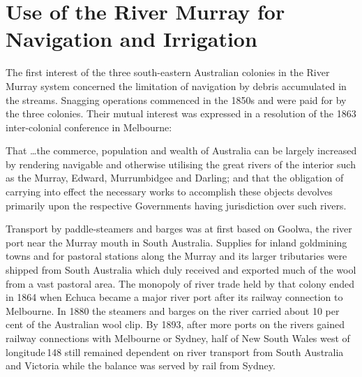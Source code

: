 
\setcounter{endnote}{0}

\chapter{Use of the River Murray for Navigation and Irrigation}
\label{ch:murray}


The first interest of the three south-eastern Australian colonies in
the River Murray system concerned the limitation of navigation by
debris accumulated in the streams.  Snagging operations commenced in
the 1850s and were paid for by the three colonies.  Their mutual
interest was expressed in a resolution of the 1863 inter-colonial
conference in Melbourne:
\begin{Quote}
	That \ldots the commerce, population and wealth of Australia
	can be largely increased by rendering navigable and otherwise
	utilising the great rivers of the interior such as the Murray,
	Edward, Murrumbidgee and Darling; and that the obligation of
	carrying into effect the necessary works to accomplish these
	objects devolves primarily upon the respective Governments
	having jurisdiction over such rivers.
\end{Quote}

Transport by paddle-steamers  and
barges was at first based on Gool\-wa,  the river
port near the Murray mouth in South Australia.  Supplies for inland
goldmining towns and for pastoral stations along the Murray and its
larger tributaries were shipped from South Australia which duly
received and exported much of the wool from a vast
pastoral area.  The monopoly of river trade held by that colony ended
in 1864 when Echuca
 became a major river port after its
railway
connection to Melbourne.  In 1880 the steamers and barges on the river
carried about 10 per cent of the Australian wool clip.  By 1893, after
more ports on the rivers gained railway connections with Melbourne or
Sydney, half of New South Wales west of longitude\,148 still remained
dependent on river transport from South Australia and Victoria while
the balance was served by rail from
Sydney.

